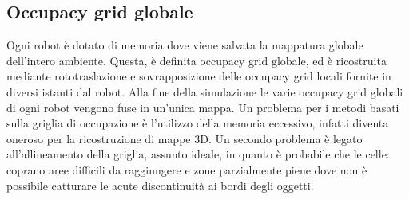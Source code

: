 \subsection{Occupacy grid globale}
Ogni robot è dotato di memoria dove viene salvata la mappatura globale 
dell'intero ambiente. Questa, è definita occupacy grid globale, ed è ricostruita 
mediante rototraslazione e sovrapposizione delle occupacy grid locali 
fornite in diversi istanti dal robot.
Alla fine della simulazione le varie occupacy grid globali di ogni robot vengono
fuse in un'unica mappa.
Un problema per i metodi basati sulla griglia di occupazione è l'utilizzo della
memoria eccessivo, infatti diventa oneroso per la ricostruzione di mappe 3D. 
Un secondo problema è legato all'allineamento della griglia, assunto ideale, in
quanto è probabile che le celle: coprano aree difficili da raggiungere e zone 
parzialmente piene dove non è possibile catturare le acute discontinuità ai 
bordi degli oggetti. 
